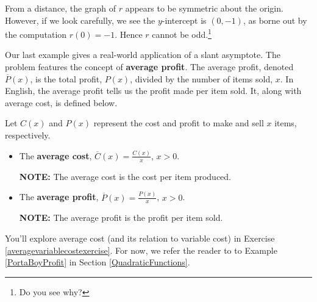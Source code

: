 \documentclass{ximera}
\begin{document}
\begin{example}
\begin{explanation}
\begin{enumerate}
\begin{center}
\end{center} 


From a distance, the graph of $r$ appears to be symmetric about the origin.  However, if we look carefully, we see the $y$-intercept is $(0,-1)$, as borne out by the computation $r(0) = -1$.  Hence $r$ cannot be odd.\footnote{Do you see why?}

\end{enumerate}
\end{explanation}
\end{example}

Our last example gives a real-world application of a slant asymptote. The problem features the concept of \textbf{average profit}. The average profit, denoted $\overline{P}(x)$,  is the total profit, $P(x)$,  divided by the number of items sold, $x$. In English, the average profit tells us the profit made per item sold. It, along with average cost, is defined below.


\begin{definition} \label{averagecostprofit} Let $C(x)$ and $P(x)$ represent the cost and profit to make and sell $x$ items, respectively.

\begin{itemize}

\item    The  \textbf{average cost}, $\overline{C}(x) = \frac{C(x)}{x}$, $x > 0$.  

\textbf{NOTE:}  The average cost is the cost per item produced.

\item   The  \textbf{average profit}, $\overline{P}(x) = \frac{P(x)}{x}$, $x > 0$.  

\textbf{NOTE:}  The average profit is the profit  per item sold.

\end{itemize}

\end{definition}


You'll explore average cost (and its relation to variable cost) in Exercise \ref{averagevariablecostexercise}.  For now, we refer the reader to to Example \ref{PortaBoyProfit}  in Section \ref{QuadraticFunctions}.
\end{document}
